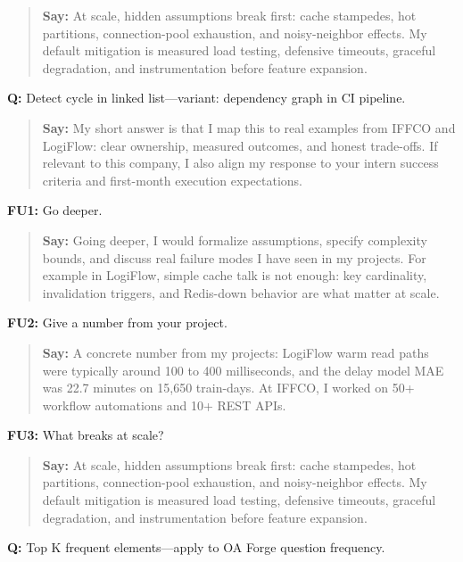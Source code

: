 \documentclass[9pt,a4paper]{article}
\begin{document}
\begin{quote}\small\textbf{Say:} At scale, hidden assumptions break first: cache stampedes, hot partitions, connection-pool exhaustion, and noisy-neighbor effects. My default mitigation is measured load testing, defensive timeouts, graceful degradation, and instrumentation before feature expansion.\end{quote}
\vspace{2mm}
\textbf{Q:} Detect cycle in linked list---variant: dependency graph in CI pipeline.

\begin{quote}\small\textbf{Say:} My short answer is that I map this to real examples from IFFCO and LogiFlow: clear ownership, measured outcomes, and honest trade-offs. If relevant to this company, I also align my response to your intern success criteria and first-month execution expectations.\end{quote}
\vspace{2mm}
\textbf{FU1:} Go deeper.

\begin{quote}\small\textbf{Say:} Going deeper, I would formalize assumptions, specify complexity bounds, and discuss real failure modes I have seen in my projects. For example in LogiFlow, simple cache talk is not enough: key cardinality, invalidation triggers, and Redis-down behavior are what matter at scale.\end{quote}
\vspace{2mm}
\textbf{FU2:} Give a number from your project.

\begin{quote}\small\textbf{Say:} A concrete number from my projects: LogiFlow warm read paths were typically around 100 to 400 milliseconds, and the delay model MAE was 22.7 minutes on 15,650 train-days. At IFFCO, I worked on 50+ workflow automations and 10+ REST APIs.\end{quote}
\vspace{2mm}
\textbf{FU3:} What breaks at scale?

\begin{quote}\small\textbf{Say:} At scale, hidden assumptions break first: cache stampedes, hot partitions, connection-pool exhaustion, and noisy-neighbor effects. My default mitigation is measured load testing, defensive timeouts, graceful degradation, and instrumentation before feature expansion.\end{quote}
\vspace{2mm}
\textbf{Q:} Top K frequent elements---apply to OA Forge question frequency.
\end{document}
